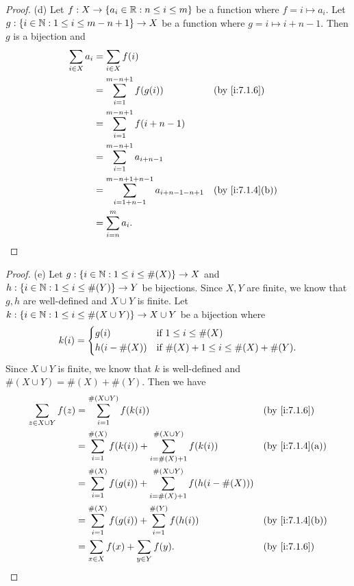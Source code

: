 \begin{proof}{(d)}
  Let \(f : X \to \left\lbrace a_i \in \mathbb{R} : n \leq i \leq m\right\rbrace\) be a function where \(f = i \mapsto a_i\).
  Let \(g : \left\lbrace i \in \mathbb{N} : 1 \leq i \leq m - n + 1\right\rbrace \to X\) be a function where \(g = i \mapsto i + n - 1\).
  Then \(g\) is a bijection and
  \begin{align*}
    \sum_{i \in X} a_i & = \sum_{i \in X} f(i)                                                                 \\
                       & = \sum_{i = 1}^{m - n + 1} f(g(i))                               &  & \by{i:7.1.6}    \\
                       & = \sum_{i = 1}^{m - n + 1} f(i + n - 1)                                               \\
                       & = \sum_{i = 1}^{m - n + 1} a_{i + n - 1}                                              \\
                       & = \sum_{i = 1 + n - 1}^{m - n + 1 + n - 1} a_{i + n - 1 - n + 1} &  & \by{i:7.1.4}[b] \\
                       & = \sum_{i = n}^m a_i.
  \end{align*}
\end{proof}

\begin{proof}{(e)}
  Let \(g : \left\lbrace i \in \mathbb{N} : 1 \leq i \leq \#(X)\right\rbrace \to X\) and \(h : \left\lbrace i \in \mathbb{N} : 1 \leq i \leq \#(Y)\right\rbrace \to Y\) be bijections.
  Since \(X, Y\) are finite, we know that \(g, h\) are well-defined and \(X \cup Y\) is finite.
  Let \(k : \left\lbrace i \in \mathbb{N} : 1 \leq i \leq \#(X \cup Y)\right\rbrace \to X \cup Y\) be a bijection where
  \[
    k(i) = \begin{dcases}
      g(i)         & \text{if } 1 \leq i \leq \#(X)                  \\
      h(i - \#(X)) & \text{if } \#(X) + 1 \leq i \leq \#(X) + \#(Y).
    \end{dcases}
  \]
  Since \(X \cup Y\) is finite, we know that \(k\) is well-defined and \(\#(X \cup Y) = \#(X) + \#(Y)\).
  Then we have
  \begin{align*}
    \sum_{z \in X \cup Y} f(z) & = \sum_{i = 1}^{\#(X \cup Y)} f(k(i))                                                &  & \by{i:7.1.6}    \\
                               & = \sum_{i = 1}^{\#(X)} f(k(i)) + \sum_{i = \#(X) + 1}^{\#(X \cup Y)} f(k(i))         &  & \by{i:7.1.4}[a] \\
                               & = \sum_{i = 1}^{\#(X)} f(g(i)) + \sum_{i = \#(X) + 1}^{\#(X \cup Y)} f(h(i - \#(X)))                      \\
                               & = \sum_{i = 1}^{\#(X)} f(g(i)) + \sum_{i = 1}^{\#(Y)} f(h(i))                        &  & \by{i:7.1.4}[b] \\
                               & = \sum_{x \in X} f(x) + \sum_{y \in Y} f(y).                                         &  & \by{i:7.1.6}
  \end{align*}
\end{proof}

